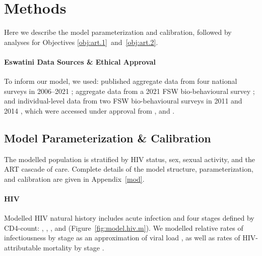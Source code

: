 \section{Methods}\label{art.meth}
Here we describe the model parameterization and calibration,
followed by analyses for Objectives \ref{obj:art.1}~and~\ref{obj:art.2}.
\paragraph{Eswatini Data Sources \& Ethical Approval}
To inform our model, we used:
published aggregate data from four national surveys
in 2006--2021 \cite{SDHS2006,SHIMS1,SHIMS2,SHIMS3};
aggregate data from a 2021 FSW bio-behavioural survey \cite{EswIBBS2022}; and
individual-level data from two FSW bio-behavioural surveys
in 2011 \cite{Baral2014} and 2014 \cite{EswKP2014},
which were accessed under approval from
, and
.
\subsection{Model Parameterization \& Calibration}\label{art.meth.par}
The modelled population is stratified by
HIV status, sex, sexual activity, and the ART cascade of care.
Complete details of the model structure, parameterization, and calibration
are given in Appendix~\ref{mod}.
\mf{} %
\paragraph{HIV}
Modelled HIV natural history
includes acute infection and four stages defined by CD4-count:
, , , and 
(Figure~\ref{fig:model.hiv.m}).
We modelled relative rates of infectiousness by stage
as an approximation of viral load \cite{Boily2009,Donnell2010,Bellan2015},
as well as rates of HIV-attributable mortality by stage \cite{Mangal2017}.
